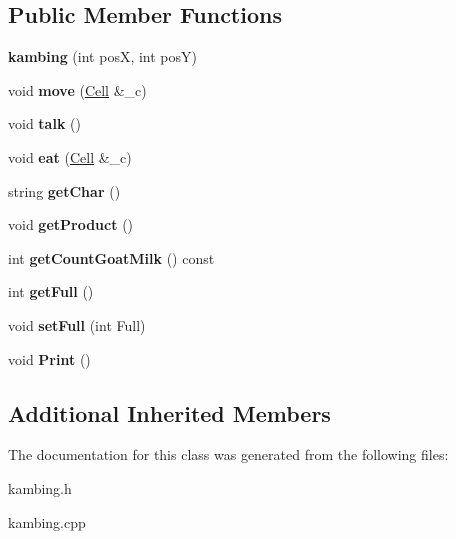 \subsection*{Public Member Functions}
\begin{DoxyCompactItemize}
\item 
\mbox{\label{classkambing_aada5f7194815a6ff15fef4fd12ddc2ce}} 
{\bfseries kambing} (int posX, int posY)
\item 
\mbox{\label{classkambing_a48748e00300850c98a62fe9794ff565e}} 
void {\bfseries move} (\hyperlink{classCell}{Cell} \&\+\_\+c)
\item 
\mbox{\label{classkambing_a9540126ad13162880929146d5a9ad473}} 
void {\bfseries talk} ()
\item 
\mbox{\label{classkambing_a76a4933cbdbba4a75464466a95c11106}} 
void {\bfseries eat} (\hyperlink{classCell}{Cell} \&\+\_\+c)
\item 
\mbox{\label{classkambing_af95ce67e4bf98635ca7422e49da3154c}} 
string {\bfseries get\+Char} ()
\item 
\mbox{\label{classkambing_a48a6fa9f91cceefc6313e46e7ddad203}} 
void {\bfseries get\+Product} ()
\item 
\mbox{\label{classkambing_ac82479fed19416958ca1e50391afc0d6}} 
int {\bfseries get\+Count\+Goat\+Milk} () const
\item 
\mbox{\label{classkambing_a52c9800cebba7544eac66343261e192b}} 
int {\bfseries get\+Full} ()
\item 
\mbox{\label{classkambing_a2b3670a955dd6b7024eb2fa8dd4b0ed2}} 
void {\bfseries set\+Full} (int Full)
\item 
\mbox{\label{classkambing_accfe5ed382e9c996f002adc8242f33f0}} 
void {\bfseries Print} ()
\end{DoxyCompactItemize}
\subsection*{Additional Inherited Members}


The documentation for this class was generated from the following files\+:\begin{DoxyCompactItemize}
\item 
kambing.\+h\item 
kambing.\+cpp\end{DoxyCompactItemize}

